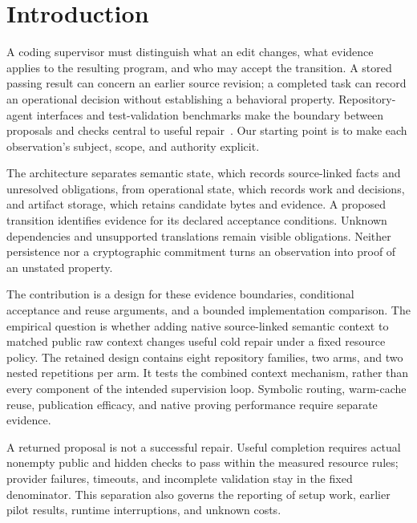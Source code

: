 \section{Introduction}
\label{sec:introduction}

A coding supervisor must distinguish what an edit changes, what evidence
applies to the resulting program, and who may accept the transition. A stored
passing result can concern an earlier source revision; a completed task can
record an operational decision without establishing a behavioral property.
Repository-agent interfaces and test-validation benchmarks make the boundary
between proposals and checks central to useful repair~\citep{baseline08,baseline11}.
Our starting point is to make each observation's subject, scope, and authority
explicit.

The architecture separates semantic state, which records source-linked facts
and unresolved obligations, from operational state, which records work and
decisions, and artifact storage, which retains candidate bytes and evidence.
A proposed transition identifies evidence for its declared acceptance
conditions. Unknown dependencies and unsupported translations remain visible
obligations. Neither persistence nor a cryptographic commitment turns an
observation into proof of an unstated property.

The contribution is a design for these evidence boundaries, conditional
acceptance and reuse arguments, and a bounded implementation comparison.
The empirical question is whether adding native source-linked semantic
context to matched public raw context changes useful cold repair under a
fixed resource policy. The retained design contains eight repository families,
two arms, and two nested repetitions per arm. It tests the combined context
mechanism, rather than every component of the intended supervision loop.
Symbolic routing, warm-cache reuse, publication efficacy, and native proving
performance require separate evidence.

A returned proposal is not a successful repair. Useful completion requires
actual nonempty public and hidden checks to pass within the measured resource
rules; provider failures, timeouts, and incomplete validation stay in the fixed
denominator. This separation also governs the reporting of setup work, earlier
pilot results, runtime interruptions, and unknown costs.

